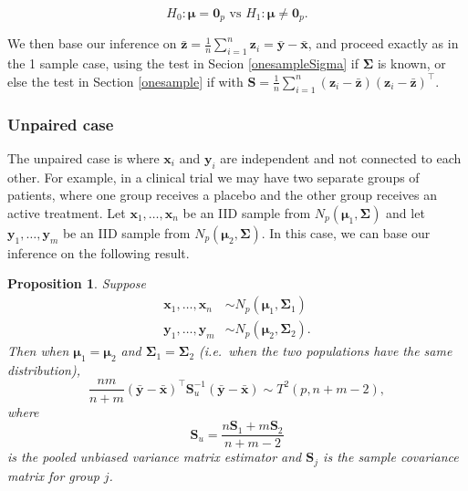 \documentclass[
]{book}
\newtheorem{proposition}{Proposition}[chapter]
\theoremstyle{definition}
\theoremstyle{definition}
\theoremstyle{definition}
\theoremstyle{definition}
\theoremstyle{remark}
\begin{document}
\[H_0: {\boldsymbol{\mu}}={\mathbf 0}_p \mbox{ vs } H_1: {\boldsymbol{\mu}}\neq {\mathbf 0}_p.\]

We then base our inference on \(\bar{\mathbf z} = \frac{1}{n} \sum_{i=1}^n \mathbf z_i = \bar{\mathbf y} - \bar{\mathbf x}\), and proceed exactly as in the 1 sample case, using the test in Secion \ref{onesampleSigma} if \(\boldsymbol{\Sigma}\) is known, or else the test in Section \ref{onesample} if with \(\mathbf S= \frac{1}{n} \sum_{i=1}^n (\mathbf z_i - \bar{\mathbf z})(\mathbf z_i - \bar{\mathbf z})^\top\).

\hypertarget{unpaired-case}{%
\subsubsection*{Unpaired case}\label{unpaired-case}}

The unpaired case is where \(\mathbf x_i\) and \(\mathbf y_i\) are independent and not connected to each other. For example, in a clinical trial we may have two separate groups of patients, where one group receives a placebo and the other group receives an active treatment. Let \(\mathbf x_1,\ldots,\mathbf x_n\) be an IID sample from \(N_p({\boldsymbol{\mu}}_1,\boldsymbol{\Sigma})\) and let \(\mathbf y_1,\ldots,\mathbf y_m\) be an IID sample from \(N_p({\boldsymbol{\mu}}_2,\boldsymbol{\Sigma})\). In this case, we can base our inference on the following result.

\begin{proposition}
\protect\hypertarget{prp:seven1}{}\label{prp:seven1}Suppose
\begin{align*}
\mathbf x_1,\ldots,\mathbf x_n  &\sim N_p({\boldsymbol{\mu}}_1,\boldsymbol{\Sigma}_1)\\ 
\mathbf y_1,\ldots,\mathbf y_m  &\sim N_p({\boldsymbol{\mu}}_2,\boldsymbol{\Sigma}_2). 
\end{align*}
Then when \({\boldsymbol{\mu}}_1 = {\boldsymbol{\mu}}_2\) and \(\boldsymbol{\Sigma}_1 = \boldsymbol{\Sigma}_2\) (i.e.~when the two populations have the same distribution),
\[\frac{nm}{n+m} (\bar{\mathbf y} - \bar{\mathbf x})^\top \mathbf S_u^{-1} (\bar{\mathbf y} - \bar{\mathbf x}) \sim T^2(p,n+m-2),\]
where
\[\mathbf S_u = \frac{n\mathbf S_1 + m\mathbf S_2}{n+m-2}\]
is the pooled unbiased variance matrix estimator
and \(\mathbf S_j\) is the sample covariance matrix for group \(j\).
\end{proposition}
\end{document}
